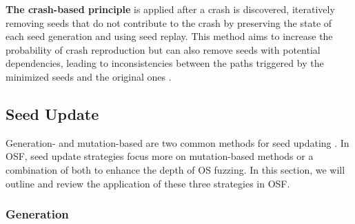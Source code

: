 \textbf{The crash-based principle} is applied after a crash is discovered, iteratively removing seeds that do not contribute to the crash by preserving the state of each seed generation and using seed replay. This method aims to increase the probability of crash reproduction but can also remove seeds with potential dependencies, leading to inconsistencies between the paths triggered by the minimized seeds and the original ones \cite{Jang2023ReUSB}.

\subsection{Seed Update}
\label{Update}
Generation- and mutation-based are two common methods for seed updating \cite{Mans2018TheAS,Sutton2007FuzzingBF}. In OSF, seed update strategies focus more on mutation-based methods or a combination of both to enhance the depth of OS fuzzing. In this section, we will outline and review the application of these three strategies in OSF.

\subsubsection{Generation}


